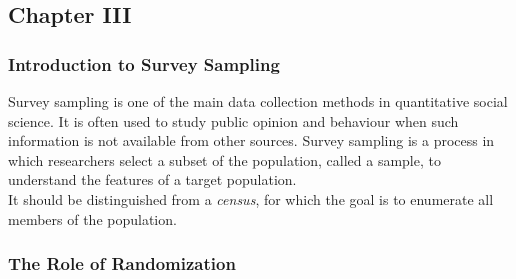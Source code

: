 \documentclass{article}
\begin{document}
    \subsection{Chapter III}
    \subsubsection{Introduction to Survey Sampling}

    \noindent Survey sampling is one of the main data collection methods in
quantitative social science. It is often used to study public opinion and
behaviour when such information is not available from other sources. Survey
sampling is a process in which researchers select a subset of the
population, called a sample, to understand the features of a target
population.\\

    \noindent It should be distinguished from a \textit{census}, for which
the goal is to enumerate all members of the population.

    \subsubsection{The Role of Randomization}
\end{document}

